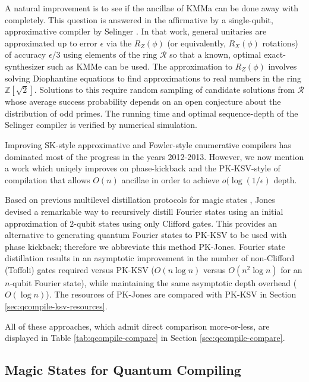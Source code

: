 A natural improvement is to see if the ancillae of KMMa can be done away with
completely. This question is answered in the affirmative by a single-qubit,
approximative compiler by Selinger
\cite{Selinger2012}. In that work, general unitaries are approximated up to
error $\epsilon$ via the $R_Z(\phi)$ (or equivalently, $R_X(\phi)$ rotations)
of accuracy $\epsilon/3$ using elements of the
ring $\mathcal{R}$ so that a known, optimal exact-synthesizer such as KMMe
can be used. The approximation to $R_Z(\phi)$ involves solving
Diophantine equations to find approximations to real numbers in the
ring $\mathbb{Z}\left[\sqrt{2}\right]$. Solutions to this require
random sampling of candidate solutions from $\mathcal{R}$ whose average
success probability depends on an open conjecture about the distribution
of odd primes. The running time and optimal sequence-depth of the
Selinger compiler is verified by numerical simulation.

Improving SK-style approximative and Fowler-style enumerative compilers has
dominated most of the progress in the years 2012-2013. However, we now mention
a work which uniqely improves on phase-kickback and the PK-KSV-style of
compilation that allows $O(n)$ ancillae in order to achieve $o(\log(1/\epsilon)$
depth.

Based on previous multilevel distillation protocols for magic states \cite{Jones2012},
Jones devised a remarkable way to recursively distill Fourier states using an
initial approximation of $2$-qubit states using only Clifford gates. This provides
an alternative to generating quantum Fourier states to PK-KSV to be used with
phase kickback; therefore we abbreviate this method PK-Jones. Fourier state
distillation results
in an asymptotic improvement in the number of non-Clifford (Toffoli) gates
required versus PK-KSV ($O(n\log n)$ versus $O(n^2\log n)$ for an
$n$-qubit Fourier state), while maintaining the same asymptotic depth overhead
($O(\log n)$). The resources of PK-Jones are compared with PK-KSV in
Section \ref{sec:qcompile-ksv-resources}.

All of these approaches, which admit direct comparison more-or-less, are
displayed in Table \ref{tab:qcompile-compare} in Section
\ref{sec:qcompile-compare}.

\subsection{Magic States for Quantum Compiling}

